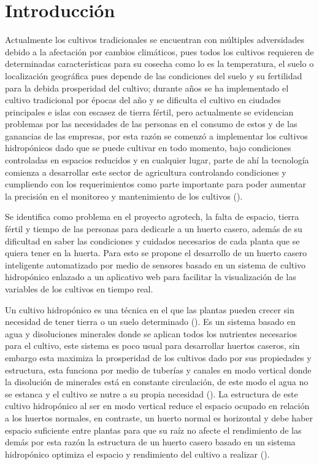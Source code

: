 \section{Introducción} %
\label{sec:introduccion} %
\thispagestyle{plain}

\noindent Actualmente los cultivos tradicionales se encuentran con múltiples
adversidades debido a la afectación por cambios climáticos, pues todos los
cultivos requieren de determinadas características para su cosecha como lo es
la temperatura, el suelo o localización geográfica pues depende de las
condiciones del suelo y su fertilidad para la debida prosperidad del cultivo;
durante años se ha implementado el cultivo tradicional por épocas del año y se
dificulta el cultivo en ciudades principales e islas con escasez de tierra
fértil, pero actualmente se evidencian problemas por las necesidades de las
personas en el consumo de estos y de las ganancias de las empresas, por esta
razón se comenzó a implementar los cultivos hidropónicos dado que se puede
cultivar en todo momento, bajo condiciones controladas en espacios reducidos y
en cualquier lugar, parte de ahí la tecnología comienza a desarrollar este
sector de agricultura controlando condiciones y cumpliendo con los
requerimientos como parte importante para poder aumentar la precisión en el
monitoreo y mantenimiento de los cultivos (\cite{katama2019}).

\noindent Se identifica como problema en el proyecto agrotech, la falta de
espacio, tierra fértil y tiempo de las personas para dedicarle a un huerto
casero, además de su dificultad en saber las condiciones y cuidados necesarios
de cada planta que se quiera tener en la huerta. Para esto se propone el
desarrollo de un huerto casero inteligente automatizado por medio de sensores
basado en un sistema de cultivo hidropónico enlazado a un aplicativo web para
facilitar la visualización de las variables de los cultivos en tiempo real.

\noindent Un cultivo hidropónico es una técnica en el que las plantas pueden
crecer sin necesidad de tener tierra o un suelo determinado (\cite{belen2019}).
Es un sistema basado en agua y disoluciones minerales donde se aplican todos
los nutrientes necesarios para el cultivo, este sistema es poco usual para
desarrollar huertos caseros, sin embargo esta maximiza la prosperidad de los
cultivos dado por sus propiedades y estructura, esta funciona por medio de
tuberías y canales en modo vertical donde la disolución de minerales está en
constante circulación, de
este modo el agua no se estanca y el cultivo se nutre a su propia necesidad
(\cite{twenergy2019}). La estructura de este cultivo hidropónico al ser en modo vertical reduce
el espacio ocupado en relación a los huertos normales, en contraste, un huerto
normal es horizontal y debe haber espacio suficiente entre plantas para que su
raíz no afecte el rendimiento de las demás por esta razón la estructura de un
huerto casero basado en un sistema hidropónico optimiza el espacio y
rendimiento del cultivo a realizar (\cite{nievesperez2017}).


